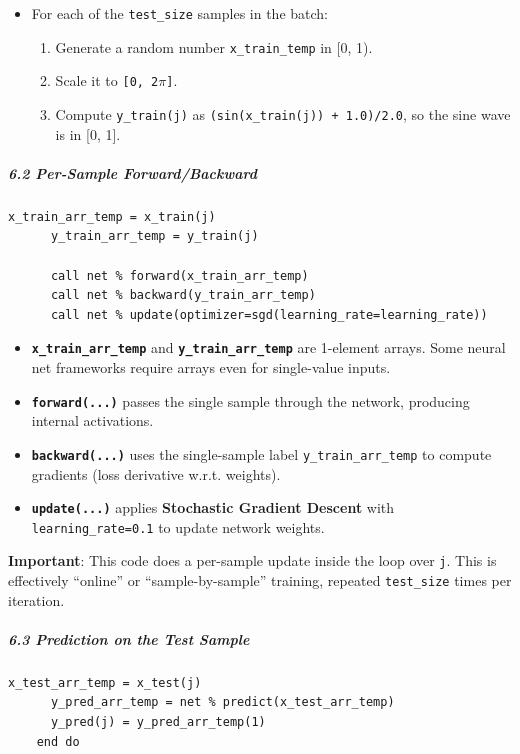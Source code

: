 \begin{itemize}
\item For each of the \texttt{test\_size} samples in the batch:

\begin{enumerate}
\item Generate a random number \texttt{x\_train\_temp} in [0, 1).
\item Scale it to \texttt{[0, 2$\pi$]}.
\item Compute \texttt{y\_train(j)} as \texttt{(sin(x\_train(j)) + 1.0)/2.0}, so the sine wave is in [0, 1].
\end{enumerate}
\end{itemize}

\subparagraph{6.2 \textbf{Per-Sample Forward/Backward}}

\begin{verbatim}
x_train_arr_temp = x_train(j)
      y_train_arr_temp = y_train(j)

      call net % forward(x_train_arr_temp)
      call net % backward(y_train_arr_temp)
      call net % update(optimizer=sgd(learning_rate=learning_rate))
\end{verbatim}

\begin{itemize}
\item \textbf{\texttt{x\_train\_arr\_temp}} and \textbf{\texttt{y\_train\_arr\_temp}} are 1-element arrays. Some neural net frameworks require arrays even for single-value inputs.
\item \textbf{\texttt{forward(...)}} passes the single sample through the network, producing internal activations.
\item \textbf{\texttt{backward(...)}} uses the single-sample label \texttt{y\_train\_arr\_temp} to compute gradients (loss derivative w.r.t. weights).
\item \textbf{\texttt{update(...)}} applies \textbf{Stochastic Gradient Descent} with \texttt{learning\_rate=0.1} to update network weights.
\end{itemize}

\textbf{Important}: This code does a per-sample update inside the loop over \texttt{j}. This is effectively ``online'' or ``sample-by-sample'' training, repeated \texttt{test\_size} times per iteration.

\subparagraph{6.3 \textbf{Prediction on the Test Sample}}

\begin{verbatim}
x_test_arr_temp = x_test(j)
      y_pred_arr_temp = net % predict(x_test_arr_temp)
      y_pred(j) = y_pred_arr_temp(1)
    end do
\end{verbatim}

